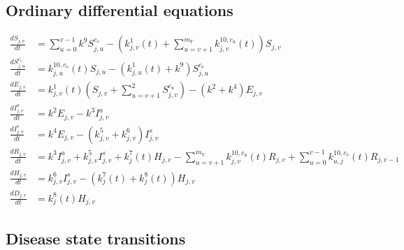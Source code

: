 \documentclass[
]{article}
\begin{document}
\hypertarget{ordinary-differential-equations}{%
\subsection{Ordinary differential equations}\label{ordinary-differential-equations}}

\begin{align}
\frac{dS_{j,v}}{dt} & = \sum_{u=0}^{v-1}k^9S_{j,u}^{c_v} - \left( k_{j,v}^{1}(t) + \sum_{u=v+1}^{{m_V}}k_{j,v}^{10,c_u}(t) \right)S_{j,v} \\
\frac{dS_{j,u}^{c_v}}{dt} & = k_{j,u}^{10,c_v}(t)S_{j,u} -\left( k_{j,u}^{1}(t) + k^9 \right)S_{j,u}^{c_v}  \\
\frac{dE_{j,v}}{dt} & = k_{j,v}^{1}(t)\left(S_{j,v}+\sum_{u=v+1}^2S_{j,v}^{c_u}\right) - (k^2+k^4)E_{j,v} \\
\frac{dI_{j,v}^a}{dt} & = k^2E_{j,v} - k^3I_{j,v}^a \\
\frac{dI_{j,v}^s}{dt} & = k^4E_{j,v} - (k_{j,v}^{5}+k_{j,v}^{6})I_{j,v}^s \\
\frac{dR_{j,v}}{dt} & = k^3I_{j,v}^a + k_{j,v}^{5}I_{j,v}^s + k_{j}^{7}(t) H_{j,v} - \sum_{u=v+1}^{{m_V}}k_{j,v}^{10,c_u}(t)R_{j,v} + \sum_{u=0}^{v-1}k_{u,j}^{10,c_v}(t)R_{j,v-1}\\
\frac{dH_{j,v}}{dt} & = k_{j,v}^{6}I_{j,v}^s - (k_{j}^{7}(t) + k_{j}^{8}(t)) H_{j,v} \\
\frac{dD_{j,v}}{dt} & =  k_{j}^{8}(t) H_{j,v}
\end{align}

\hypertarget{disease-state-transitions}{%
\subsection{Disease state transitions}\label{disease-state-transitions}}
\end{document}

